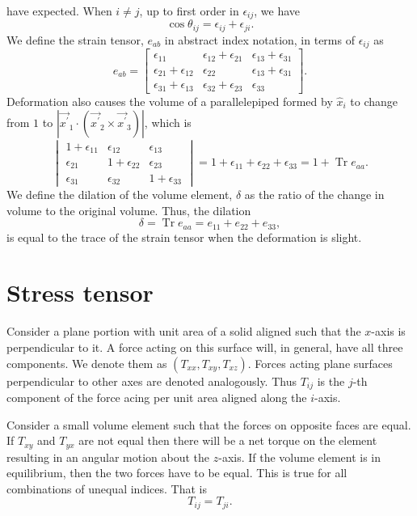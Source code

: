 \documentclass{article}
\newcommand{\op}{\prime}
\DeclareMathOperator{\tr}{Tr}
\begin{document}
have expected. When $i \ne j$, up to first order in $\epsilon_{ij}$, we have
\begin{equation}\label{e6}
\cos\theta_{ij} = \epsilon_{ij} + \epsilon_{ji}.
\end{equation}
We define the strain tensor, $e_{ab}$ in abstract index notation, in terms of 
$\epsilon_{ij}$ as
\begin{equation}\label{e7}
e_{ab} = \begin{bmatrix}
\epsilon_{11} & \epsilon_{12} + \epsilon_{21} & \epsilon_{13} + \epsilon_{31} \\
\epsilon_{21} + \epsilon_{12} & \epsilon_{22} & \epsilon_{13} + \epsilon_{31} \\
\epsilon_{31} + \epsilon_{13} & \epsilon_{32} + \epsilon_{23} & \epsilon_{33} 
\end{bmatrix}.
\end{equation}
Deformation also causes the volume of a parallelepiped formed by $\hat{x}_i$
to change from $1$ to $|\vec{x^\op}_1\cdot(\vec{x^\op}_2\times\vec{x^\op}_3)|$,
which is
\[
\begin{vmatrix}
1 + \epsilon_{11} & \epsilon_{12} & \epsilon_{13} \\
\epsilon_{21} & 1 + \epsilon_{22} & \epsilon_{23} \\
\epsilon_{31} & \epsilon_{32} & 1 + \epsilon_{33}
\end{vmatrix} = 1 + \epsilon_{11} + \epsilon_{22} + \epsilon_{33} = 
1 + \tr{e_{aa}}.
\]
We define the dilation of the volume element, $\delta$ as the ratio of the 
change in volume to the original volume. Thus, the dilation
\begin{equation}\label{e8}
\delta = \tr{e_{aa}} = e_{11} + e_{22} + e_{33},
\end{equation}
is equal to the trace of the strain tensor when the deformation is slight.

\section{Stress tensor}
Consider a plane portion with unit area of a solid aligned such that the $x$-axis 
is perpendicular to it. A force acting on this surface will, in general, have all
three components. We denote them as $(T_{xx}, T_{xy}, T_{xz})$. Forces acting
plane surfaces perpendicular to other axes are denoted analogously. Thus
$T_{ij}$ is the $j$-th component of the force acing per unit area aligned along
the $i$-axis.

Consider a small volume element such that the forces on opposite faces are 
equal. If $T_{xy}$ and $T_{yx}$ are not equal then there will be a net torque
on the element resulting in an angular motion about the $z$-axis. If the volume
element is in equilibrium, then the two forces have to be equal. This is true
for all combinations of unequal indices. That is
\begin{equation}\label{e9}
T_{ij} = T_{ji}.
\end{equation}
\end{document}
